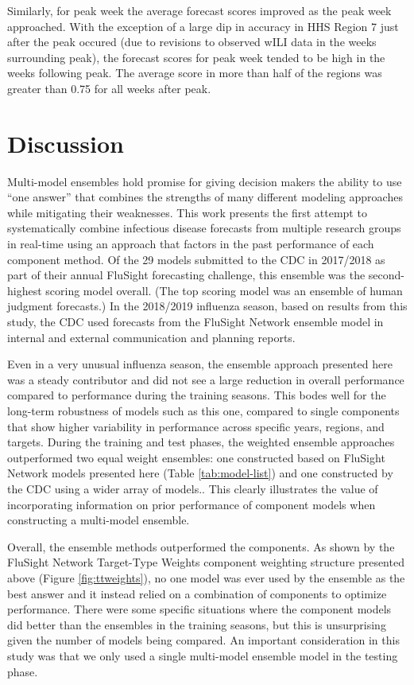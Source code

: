\documentclass{article}\usepackage[]{graphicx}\usepackage[]{color}
\begin{document}
Similarly, for peak week the average forecast scores improved as the peak week approached. With the exception of a large dip in accuracy in HHS Region 7 just after the peak occured (due to revisions to observed wILI data in the weeks surrounding peak), the forecast scores for peak week tended to be high in the weeks following peak. The average score in more than half of the regions was greater than 0.75 for all weeks after peak. 


\section{Discussion}

Multi-model ensembles hold promise for giving decision makers the ability to use ``one answer'' that combines the strengths of many different modeling approaches while mitigating their weaknesses. 
This work presents the first attempt to systematically combine infectious disease forecasts from multiple research groups in real-time using an approach that factors in the past performance of each component method.
Of the 29 models submitted to the CDC in 2017/2018 as part of their annual FluSight forecasting challenge, this ensemble was the second-highest scoring model overall. 
(The top scoring model was an ensemble of human judgment forecasts.\cite{farrow2017human})
In the 2018/2019 influenza season, based on results from this study, the CDC used forecasts from the FluSight Network ensemble model in internal and external communication and planning reports.


Even in a very unusual influenza season, the ensemble approach presented here was a steady contributor and did not see a large reduction in overall performance compared to performance during the training seasons. 
This bodes well for the long-term robustness of models such as this one, compared to single components that show higher variability in performance across specific years, regions, and targets. 
During the training and test phases, the weighted ensemble approaches outperformed two equal weight ensembles: one constructed based on FluSight Network models presented here (Table \ref{tab:model-list}) and one constructed by the CDC using a wider array of models.\cite{McGowan2018}. 
This clearly illustrates the value of incorporating information on prior performance of component models when constructing a multi-model ensemble.

Overall, the ensemble methods outperformed the components. 
As shown by the FluSight Network Target-Type Weights component weighting structure presented above (Figure \ref{fig:ttweights}), no one model was ever used by the ensemble as the best answer and it instead relied on a combination of components to optimize performance. 
There were some specific situations where the component models did better than the ensembles in the training seasons, but this is unsurprising given the number of models being compared.
An important consideration in this study was that we only used a single multi-model ensemble model in the testing phase.%
\end{document}
